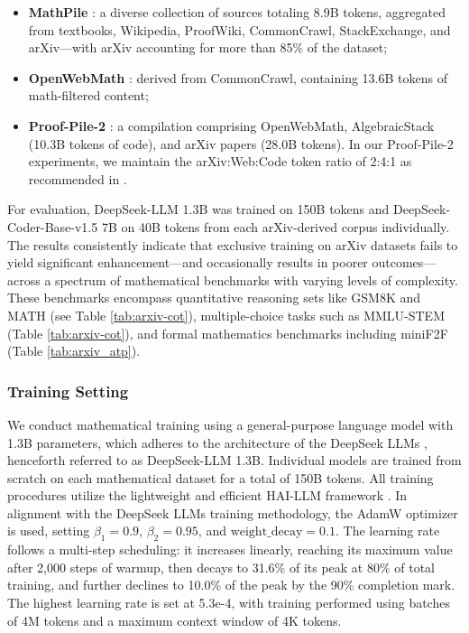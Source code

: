 \begin{itemize}[topsep=0pt]
    \item \textbf{MathPile} \citep{mathpile}: a diverse collection of sources totaling 8.9B tokens, aggregated from textbooks, Wikipedia, ProofWiki, CommonCrawl, StackExchange, and arXiv—with arXiv accounting for more than 85\% of the dataset;
    \item \textbf{OpenWebMath} \citep{openwebmath}: derived from CommonCrawl, containing 13.6B tokens of math-filtered content;
    \item \textbf{Proof-Pile-2} \citep{llemma}: a compilation comprising OpenWebMath, AlgebraicStack (10.3B tokens of code), and arXiv papers (28.0B tokens). In our Proof-Pile-2 experiments, we maintain the arXiv:Web:Code token ratio of 2:4:1 as recommended in \cite{llemma}.
\end{itemize}

For evaluation, DeepSeek-LLM 1.3B was trained on 150B tokens and DeepSeek-Coder-Base-v1.5 7B on 40B tokens from each arXiv-derived corpus individually. The results consistently indicate that exclusive training on arXiv datasets fails to yield significant enhancement—and occasionally results in poorer outcomes—across a spectrum of mathematical benchmarks with varying levels of complexity. These benchmarks encompass quantitative reasoning sets like GSM8K and MATH (see Table \ref{tab:arxiv-cot}), multiple-choice tasks such as MMLU-STEM (Table \ref{tab:arxiv-cot}), and formal mathematics benchmarks including miniF2F (Table \ref{tab:arxiv_atp}).

\subsubsection{Training Setting}
\label{sec:quality-policy}
We conduct mathematical training using a general-purpose language model with 1.3B parameters, which adheres to the architecture of the DeepSeek LLMs \citep{deepseek-llm}, henceforth referred to as DeepSeek-LLM 1.3B. Individual models are trained from scratch on each mathematical dataset for a total of 150B tokens. All training procedures utilize the lightweight and efficient HAI-LLM framework \citep{haillm}. In alignment with the DeepSeek LLMs training methodology, the AdamW optimizer \citep{adamW} is used, setting $\beta_1=0.9$, $\beta_2=0.95$, and $\mathrm{weight\_decay}=0.1$. The learning rate follows a multi-step scheduling: it increases linearly, reaching its maximum value after 2,000 steps of warmup, then decays to 31.6\% of its peak at 80\% of total training, and further declines to 10.0\% of the peak by the 90\% completion mark. The highest learning rate is set at 5.3e-4, with training performed using batches of 4M tokens and a maximum context window of 4K tokens.

